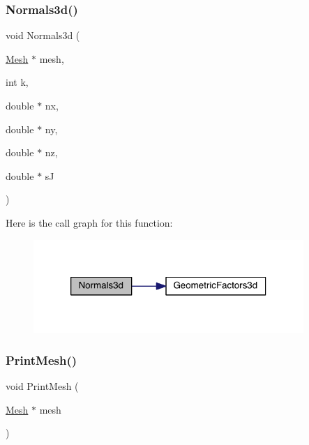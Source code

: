 \subsubsection{\texorpdfstring{Normals3d()}{Normals3d()}}
{\footnotesize\ttfamily void Normals3d (\begin{DoxyParamCaption}\item[{\hyperlink{a00557_aeffbe0891ab73a4d8964c9cb7978426e}{Mesh} $\ast$}]{mesh,  }\item[{int}]{k,  }\item[{double $\ast$}]{nx,  }\item[{double $\ast$}]{ny,  }\item[{double $\ast$}]{nz,  }\item[{double $\ast$}]{sJ }\end{DoxyParamCaption})}

Here is the call graph for this function\+:\nopagebreak
\begin{figure}[H]
\begin{center}
\leavevmode
\includegraphics[width=290pt]{a00590_a7dad59f4c5add70012ffb84d688ce948_cgraph}
\end{center}
\end{figure}
\mbox{\label{a00590_ad62a25bbacac8912e4932b3163c885f0}} 
\subsubsection{\texorpdfstring{Print\+Mesh()}{PrintMesh()}}
{\footnotesize\ttfamily void Print\+Mesh (\begin{DoxyParamCaption}\item[{\hyperlink{a00557_aeffbe0891ab73a4d8964c9cb7978426e}{Mesh} $\ast$}]{mesh }\end{DoxyParamCaption})}

\mbox{\label{a00590_ae31747f9df306a59e6f4df61fddfe15f}} 
